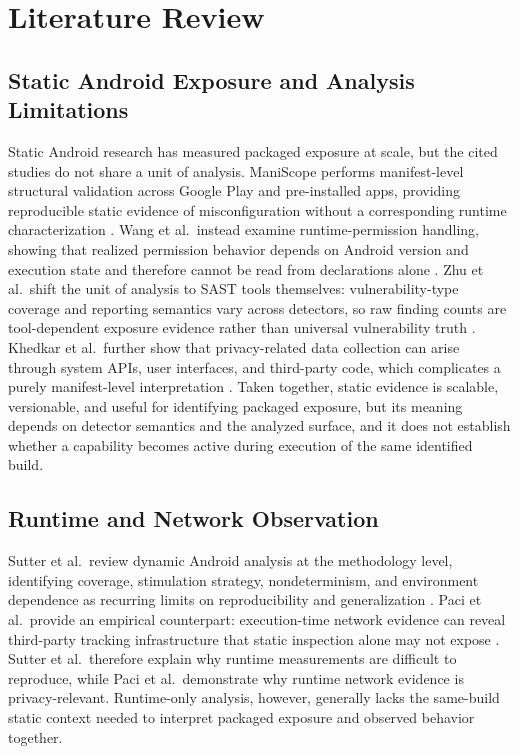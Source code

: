 \section{Literature Review}

\subsection{Static Android Exposure and Analysis Limitations}
Static Android research has measured packaged exposure at scale, but the cited studies do not share a unit of analysis. ManiScope performs manifest-level structural validation across Google Play and pre-installed apps, providing reproducible static evidence of misconfiguration without a corresponding runtime characterization \cite{yang2022maniscope}. Wang et al.\ instead examine runtime-permission handling, showing that realized permission behavior depends on Android version and execution state and therefore cannot be read from declarations alone \cite{wang2023runtimepermissions}. Zhu et al.\ shift the unit of analysis to SAST tools themselves: vulnerability-type coverage and reporting semantics vary across detectors, so raw finding counts are tool-dependent exposure evidence rather than universal vulnerability truth \cite{zhu2024sastandroid}. Khedkar et al.\ further show that privacy-related data collection can arise through system APIs, user interfaces, and third-party code, which complicates a purely manifest-level interpretation \cite{khedkar2026privacydata}. Taken together, static evidence is scalable, versionable, and useful for identifying packaged exposure, but its meaning depends on detector semantics and the analyzed surface, and it does not establish whether a capability becomes active during execution of the same identified build.

\subsection{Runtime and Network Observation}
Sutter et al.\ review dynamic Android analysis at the methodology level, identifying coverage, stimulation strategy, nondeterminism, and environment dependence as recurring limits on reproducibility and generalization \cite{sutter2024dynamic}. Paci et al.\ provide an empirical counterpart: execution-time network evidence can reveal third-party tracking infrastructure that static inspection alone may not expose \cite{paci2023tracking}. Sutter et al.\ therefore explain why runtime measurements are difficult to reproduce, while Paci et al.\ demonstrate why runtime network evidence is privacy-relevant. Runtime-only analysis, however, generally lacks the same-build static context needed to interpret packaged exposure and observed behavior together.

